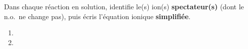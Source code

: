 \documentclass[11pt,a4paper]{article}
\begin{document}
\begin{exo}
Dans chaque réaction en solution, identifie le(s) ion(s) \textbf{spectateur(s)} (dont le n.o.\ ne
change pas), puis écris l'équation ionique \textbf{simplifiée}.
\begin{enumerate}[label=\alph*)]
  \item {}
  \item {}
\end{enumerate}
\end{exo}
\end{document}
